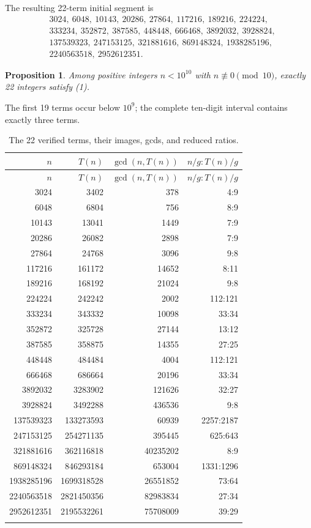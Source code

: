 \documentclass[11pt]{article}
\newtheorem{proposition}{Proposition}
\begin{document}
The resulting 22-term initial segment is
\[
\begin{aligned}
&3024,\ 6048,\ 10143,\ 20286,\ 27864,\ 117216,\ 189216,\ 224224,\\
&333234,\ 352872,\ 387585,\ 448448,\ 666468,\ 3892032,\ 3928824,\\
&137539323,\ 247153125,\ 321881616,\ 869148324,\ 1938285196,\\
&2240563518,\ 2952612351.
\end{aligned}
\]

\begin{proposition}
Among positive integers \(n<10^{10}\) with \(n\not\equiv0\pmod {10}\), exactly 22 integers satisfy (1).
\end{proposition}

The first 19 terms occur below \(10^9\); the complete ten-digit interval contains exactly three terms.

\begin{longtable}{r r r r}
\caption{The 22 verified terms, their images, gcds, and reduced ratios.}
\label{tab:data}\\
\toprule
$n$ & $T(n)$ & $\gcd(n,T(n))$ & $n/g:T(n)/g$\\
\midrule
\endfirsthead
\toprule
$n$ & $T(n)$ & $\gcd(n,T(n))$ & $n/g:T(n)/g$\\
\midrule
\endhead

3024 & 3402 & 378 & 4:9 \\
6048 & 6804 & 756 & 8:9 \\
10143 & 13041 & 1449 & 7:9 \\
20286 & 26082 & 2898 & 7:9 \\
27864 & 24768 & 3096 & 9:8 \\
117216 & 161172 & 14652 & 8:11 \\
189216 & 168192 & 21024 & 9:8 \\
224224 & 242242 & 2002 & 112:121 \\
333234 & 343332 & 10098 & 33:34 \\
352872 & 325728 & 27144 & 13:12 \\
387585 & 358875 & 14355 & 27:25 \\
448448 & 484484 & 4004 & 112:121 \\
666468 & 686664 & 20196 & 33:34 \\
3892032 & 3283902 & 121626 & 32:27 \\
3928824 & 3492288 & 436536 & 9:8 \\
137539323 & 133273593 & 60939 & 2257:2187 \\
247153125 & 254271135 & 395445 & 625:643 \\
321881616 & 362116818 & 40235202 & 8:9 \\
869148324 & 846293184 & 653004 & 1331:1296 \\
1938285196 & 1699318528 & 26551852 & 73:64 \\
2240563518 & 2821450356 & 82983834 & 27:34 \\
2952612351 & 2195532261 & 75708009 & 39:29 \\

\bottomrule
\endlastfoot
\end{longtable}
\end{document}
